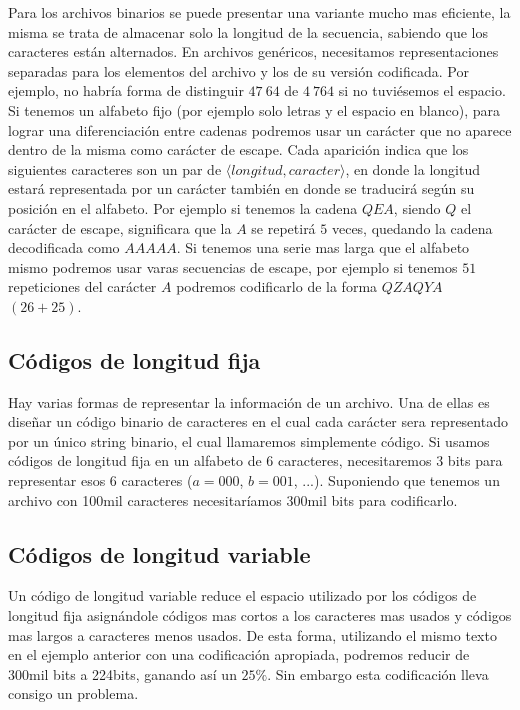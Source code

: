 Para los archivos binarios se puede presentar una variante mucho mas eficiente, la misma se trata de almacenar solo la longitud de la secuencia, sabiendo que los caracteres est\'an alternados. En archivos gen\'ericos, necesitamos representaciones separadas para los elementos del archivo y los de su versi\'on codificada. Por ejemplo, no habr\'ia forma de distinguir $47\ 64$ de $4\ 764$ si no tuvi\'esemos el espacio. Si tenemos un alfabeto fijo (por ejemplo solo letras y el espacio en blanco), para lograr una diferenciaci\'on entre cadenas podremos usar un car\'acter que no aparece dentro de la misma como car\'acter de escape. Cada aparici\'on indica que los siguientes caracteres son un par de $\langle longitud, caracter \rangle$, en donde la longitud estar\'a representada por un car\'acter tambi\'en en donde se traducir\'a seg\'un su posici\'on en el alfabeto. Por ejemplo si tenemos la cadena $QEA$, siendo $Q$ el car\'acter de escape, significara que la $A$ se repetir\'a $5$ veces, quedando la cadena
decodificada como $AAAAA$. Si tenemos una serie mas larga que el alfabeto mismo podremos usar varas secuencias de escape, por ejemplo si tenemos $51$ repeticiones del car\'acter $A$ podremos codificarlo de la forma $QZAQYA$ $(26+25)$.

\subsection{C\'odigos de longitud fija}

Hay varias formas de representar la informaci\'on de un archivo. Una de ellas es dise\~nar un c\'odigo binario de caracteres en el cual cada car\'acter sera representado por un \'unico string binario, el cual llamaremos simplemente c\'odigo. Si usamos c\'odigos de longitud fija en un alfabeto de $6$ caracteres, necesitaremos $3$ bits para representar esos $6$ caracteres ($a=000$, $b=001$, ...). Suponiendo que tenemos un archivo con 100mil caracteres necesitar\'iamos 300mil bits para codificarlo.

\subsection{C\'odigos de longitud variable}

Un c\'odigo de longitud variable reduce el espacio utilizado por los c\'odigos de longitud fija asign\'andole c\'odigos mas cortos a los caracteres mas usados y c\'odigos mas largos a caracteres menos usados. De esta forma, utilizando el mismo texto en el ejemplo anterior con una codificaci\'on apropiada, podremos reducir de 300mil bits a 224bits, ganando as\'i un $25\%$. Sin embargo esta codificaci\'on lleva consigo un problema.

